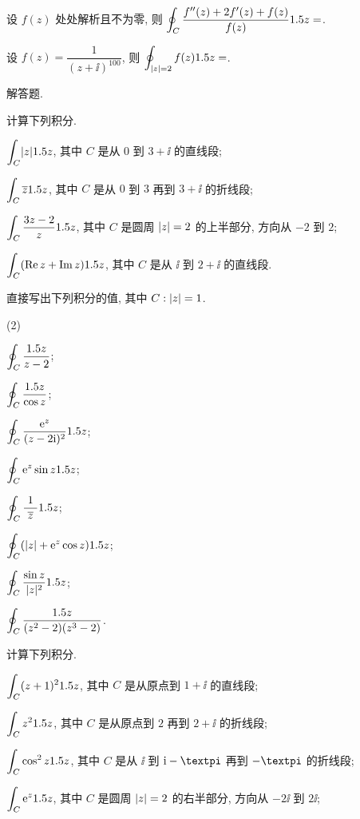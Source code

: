 \begin{homework}
\begin{homework}
    \item 设 $f(z)$ 处处解析且不为零, 则 $\displaystyle\oint_C\frac{f''(z)+2f'(z)+f(z)}{f(z)}1.5 z=$\fillblank{}.
    \item 设 $f(z)=\dfrac1{(z+\ii)^{100}}$, 则 $\displaystyle\oint_{\lvert z\rvert=2}f(z)1.5 z=$\fillblank{}.
  \end{homework}
  \item 解答题.
  \begin{homework}
    \item 计算下列积分.
    \begin{subhomework}
      \item $\displaystyle\int_C \lvert z\rvert1.5 z$, 其中 $C$ 是从 $0$ 到 $3+\ii$ 的直线段;
      \item $\displaystyle\int_C \overline z1.5 z$, 其中 $C$ 是从 $0$ 到 $3$ 再到 $3+\ii$ 的折线段;
      \item $\displaystyle\int_C\dfrac{3z-2}{z}1.5 z$, 其中 $C$ 是圆周 $\lvert z\rvert=2$ 的上半部分, 方向从 $-2$ 到 $2$;
      \item $\displaystyle\int_C(\operatorname{Re} z+\operatorname{Im} z)1.5 z$, 其中 $C$ 是从 $\ii$ 到 $2+\ii$ 的直线段.
    \end{subhomework}
    \item 直接写出下列积分的值, 其中 $C:\lvert z\rvert=1$.
    \begin{subhomework}(2)
      \item $\displaystyle\oint_C\frac{1.5 z}{z-2}$;
      \item $\displaystyle\oint_C\frac{1.5 z}{\cos z}$;
      \item $\displaystyle\oint_C\frac{\mathrm{e}^z}{(z-2\mathrm{i})^2}1.5 z$;
      \item $\displaystyle\oint_C\mathrm{e}^z\sin z1.5 z$;
      \item $\displaystyle\oint_C\dfrac{~1~}{\overline z}1.5 z$;
      \item $\displaystyle\oint_C(\lvert z\rvert+\mathrm{e}^z\cos z)1.5 z$;
      \item $\displaystyle\oint_C\dfrac{\sin z}{\lvert z\rvert^2}1.5 z$;
      \item $\displaystyle\oint_C\frac{1.5 z}{(z^2-2)(z^3-2)}$.
    \end{subhomework}
    \item 计算下列积分.
    \begin{subhomework}
      \item $\displaystyle\int_C(z+1)^21.5 z$, 其中 $C$ 是从原点到 $1+\ii$ 的直线段;
      \item $\displaystyle\int_Cz^21.5 z$, 其中 $C$ 是从原点到 $2$ 再到 $2+\ii$ 的折线段;
      \item $\displaystyle\int_C\cos^2z1.5 z$, 其中 $C$ 是从 $\ii$ 到 $\ii-\cpi$ 再到 $-\cpi$ 的折线段;
      \item $\displaystyle\int_C \mathrm{e}^z1.5 z$, 其中 $C$ 是圆周 $\lvert z\rvert=2$ 的右半部分, 方向从 $-2\ii$ 到 $2\ii$;

\end{subhomework}
\end{homework}
\end{homework}
